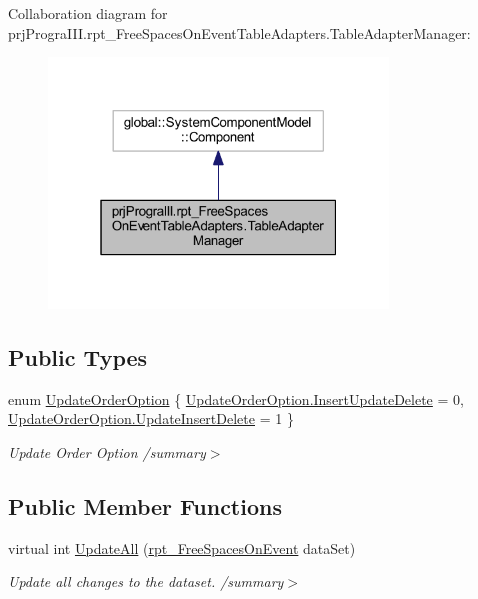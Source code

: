 Collaboration diagram for prj\+Progra\+I\+I\+I.\+rpt\+\_\+\+Free\+Spaces\+On\+Event\+Table\+Adapters.\+Table\+Adapter\+Manager\+:
\nopagebreak
\begin{figure}[H]
\begin{center}
\leavevmode
\includegraphics[width=256pt]{classprj_progra_i_i_i_1_1rpt___free_spaces_on_event_table_adapters_1_1_table_adapter_manager__coll__graph}
\end{center}
\end{figure}
\subsection*{Public Types}
\begin{DoxyCompactItemize}
\item 
enum \hyperlink{classprj_progra_i_i_i_1_1rpt___free_spaces_on_event_table_adapters_1_1_table_adapter_manager_a9cfd63ba078114fdb1994cfe5f0d2eeb}{Update\+Order\+Option} \{ \hyperlink{classprj_progra_i_i_i_1_1rpt___free_spaces_on_event_table_adapters_1_1_table_adapter_manager_a9cfd63ba078114fdb1994cfe5f0d2eeba27b77cb15d3da7ded0250d0001bc6755}{Update\+Order\+Option.\+Insert\+Update\+Delete} = 0, 
\hyperlink{classprj_progra_i_i_i_1_1rpt___free_spaces_on_event_table_adapters_1_1_table_adapter_manager_a9cfd63ba078114fdb1994cfe5f0d2eeba894fcc001e51f673d3fb5f3096473dd8}{Update\+Order\+Option.\+Update\+Insert\+Delete} = 1
 \}\begin{DoxyCompactList}\small\item\em Update Order Option /summary$>$ \end{DoxyCompactList}
\end{DoxyCompactItemize}
\subsection*{Public Member Functions}
\begin{DoxyCompactItemize}
\item 
virtual int \hyperlink{classprj_progra_i_i_i_1_1rpt___free_spaces_on_event_table_adapters_1_1_table_adapter_manager_a684a94d71f9fb112715e3a291f5eeb5b}{Update\+All} (\hyperlink{classprj_progra_i_i_i_1_1rpt___free_spaces_on_event}{rpt\+\_\+\+Free\+Spaces\+On\+Event} data\+Set)
\begin{DoxyCompactList}\small\item\em Update all changes to the dataset. /summary$>$ \end{DoxyCompactList}\end{DoxyCompactItemize}
